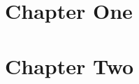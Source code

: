 \documentclass[12pt]{memoir}
\begin{document}
\chapter{Chapter One}
\CHARkaylen {}
\CHARnikki {}
\CHARkaylen
{}

\chapter{Chapter Two}
\CHARkaylen {}
\CHARnikki {}
 
 
\CHARkaylen
{}

\cleardoublepage
\PrintNovelIndexes
\end{document}
